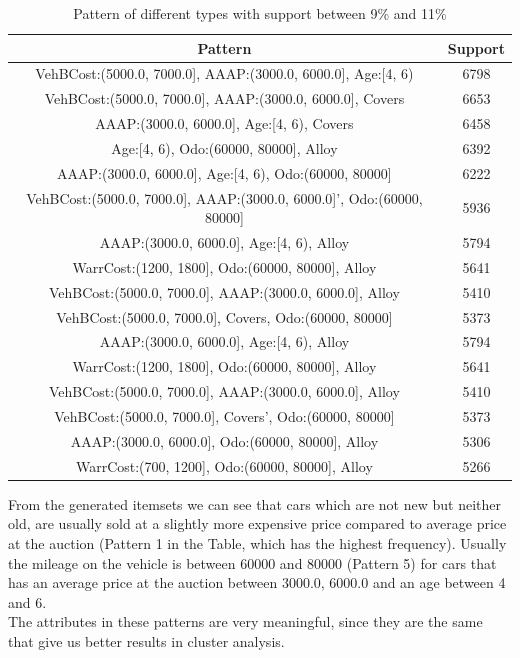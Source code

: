 \documentclass{article}
\begin{document}
	
	
	\begin{table}[H]
		\centering
		\begin{tabular}{|c|c|}
			\hline
			\textbf{Pattern} & \textbf{Support} \\
			\hline
			\rowcolor{Gray}
			VehBCost:(5000.0, 7000.0], AAAP:(3000.0, 6000.0], Age:[4, 6) &  6798\\
			VehBCost:(5000.0, 7000.0], AAAP:(3000.0, 6000.0], Covers &  6653\\
			\rowcolor{Gray}
			AAAP:(3000.0, 6000.0], Age:[4, 6), Covers &  6458\\
			Age:[4, 6), Odo:(60000, 80000], Alloy &  6392\\
			\rowcolor{Gray}
			AAAP:(3000.0, 6000.0], Age:[4, 6), Odo:(60000, 80000] &  6222\\
			VehBCost:(5000.0, 7000.0], AAAP:(3000.0, 6000.0]', Odo:(60000, 80000]  & 5936\\
			\rowcolor{Gray}
			AAAP:(3000.0, 6000.0], Age:[4, 6), Alloy &  5794\\
			WarrCost:(1200, 1800], Odo:(60000, 80000], Alloy & 5641\\
			\rowcolor{Gray}
			VehBCost:(5000.0, 7000.0], AAAP:(3000.0, 6000.0], Alloy &  5410\\
			VehBCost:(5000.0, 7000.0], Covers, Odo:(60000, 80000] & 5373\\
			\rowcolor{Gray}
			AAAP:(3000.0, 6000.0], Age:[4, 6), Alloy & 5794\\
			WarrCost:(1200, 1800], Odo:(60000, 80000], Alloy & 5641\\
			\rowcolor{Gray}
			VehBCost:(5000.0, 7000.0], AAAP:(3000.0, 6000.0], Alloy & 5410\\
			VehBCost:(5000.0, 7000.0], Covers', Odo:(60000, 80000] & 5373\\
			\rowcolor{Gray}
			AAAP:(3000.0, 6000.0], Odo:(60000, 80000], Alloy & 5306\\
			WarrCost:(700, 1200], Odo:(60000, 80000], Alloy & 5266\\\hline
		\end{tabular}
		\caption{Pattern of different types with support between 9\% and 11\%}
	\end{table}
	
	From the generated itemsets we can see that cars which are not new but neither old, are usually sold at a slightly more expensive price compared to average price at the auction (Pattern 1 in the Table, which has the highest frequency). Usually the mileage on the vehicle is between 60000 and 80000 (Pattern 5) for cars that has an average price at the auction between 3000.0, 6000.0 and an age between 4 and 6.\\
	The attributes in these patterns are very meaningful, since they are the same that give us better results in cluster analysis. 
	
\end{document}
